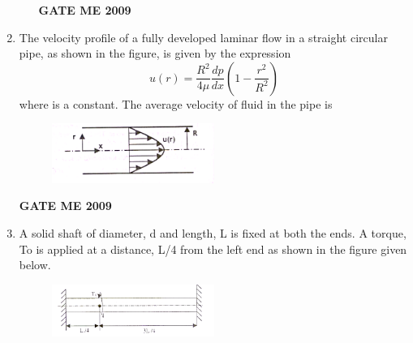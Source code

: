 \documentclass[journal]{IEEEtran}
\begin{document}
\begin{enumerate}[leftmargin=0pt]
\begin{enumerate}
\hfill{\textbf{GATE ME 2009}}
\end{enumerate}



\item The velocity profile of a fully developed laminar flow in a straight circular pipe, as shown in the figure, is given by the expression
\[
u(r) = \frac{R^2}{4\mu} \frac{dp}{dx} \left(1 - \frac{r^2}{R^2}\right)
\]
where is a constant. The average velocity of fluid in the pipe is
\begin{figure}[h]
  \centering
  \includegraphics[width=0.5\textwidth]{Figs/image (6).png}
  \caption{}
\end{figure}


\begin{enumerate}
\hfill{\textbf{GATE ME 2009}}
\end{enumerate}





\item A solid shaft of diameter, d and length, L is fixed at both the ends. A torque, To is applied at a distance,
L/4 from the left end as shown in the figure given below.


\begin{figure}[h]
  \centering
  \includegraphics[width=0.5\textwidth]{Figs/image (7).png}
  \caption{}
\end{figure}


\end{enumerate}
\end{document}
